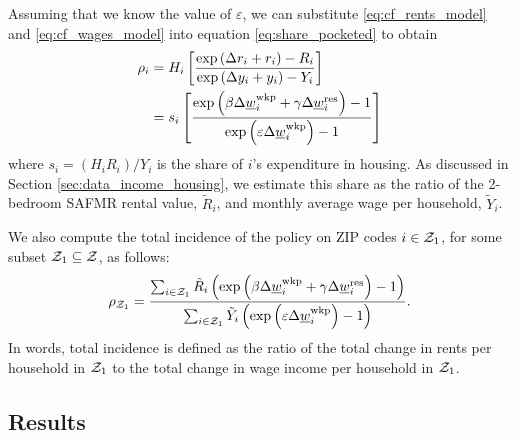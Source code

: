Assuming that we know the value of $\varepsilon$, we can substitute
\eqref{eq:cf_rents_model} and \eqref{eq:cf_wages_model} into equation
\eqref{eq:share_pocketed} to obtain
\begin{equation*}\label{eq:rho}
    \begin{split}
        \rho_i & = H_i \left[ 
        \frac{\exp \left(\Delta r_i + r_i \right) - R_i }
             {\exp \left(\Delta y_i + y_i \right) - Y_i }
        \right] \\
        & = s_i \left[
            \frac{\exp \left( \beta \Delta \underline{w}_i^{\text{wkp}} + \gamma \Delta \underline{w}_i^{\text{res}} \right) - 1 }
                {\exp \left( \varepsilon \Delta \underline{w}_i^{\text{wkp}} \right) - 1 }
            \right]
    \end{split}
\end{equation*}
where $s_i = \left(H_i R_i\right)/Y_i$ is the share of $i$'s expenditure in 
housing.
As discussed in Section \ref{sec:data_income_housing},
we estimate this share as the ratio of the 2-bedroom SAFMR rental value, 
$\tilde R_i$, and monthly average wage per household, $\tilde Y_i$.

We also compute the total incidence of the policy on ZIP codes $i\in\mathcal{Z}_1$,
for some subset $\mathcal{Z}_1\subseteq\mathcal{Z}$, as follows:
\begin{equation*}\label{eq:tot_incidence}
    \rho_{\mathcal{Z}_1} = 
        \frac{\sum_{i\in\mathcal{Z}_1} \tilde R_i \left(\exp \left( \beta \Delta \underline{w}_i^{\text{wkp}} 
                                    + \gamma \Delta \underline{w}_i^{\text{res}} \right) - 1\right) }
            {\sum_{i\in\mathcal{Z}_1} \tilde Y_i \left( \exp \left( \varepsilon \Delta \underline{w}_i^{\text{wkp}} \right) 
                                    - 1\right) } .
\end{equation*}
In words, total incidence is defined as the ratio of the total change in rents
per household in $\mathcal{Z}_1$ to the total change in wage income per household 
in $\mathcal{Z}_1$.

\subsection{Results}\label{sec:results_cf}

